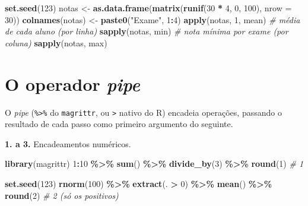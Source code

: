 \documentclass[
  portuguese,
  11pt,
  openany]{book}
\newenvironment{Shaded}{\begin{snugshade}}{\end{snugshade}}
\newcommand{\AttributeTok}[1]{\textcolor[rgb]{0.13,0.29,0.53}{#1}}
\newcommand{\CommentTok}[1]{\textcolor[rgb]{0.56,0.35,0.01}{\textit{#1}}}
\newcommand{\DecValTok}[1]{\textcolor[rgb]{0.00,0.00,0.81}{#1}}
\newcommand{\FunctionTok}[1]{\textcolor[rgb]{0.13,0.29,0.53}{\textbf{#1}}}
\newcommand{\NormalTok}[1]{#1}
\newcommand{\OtherTok}[1]{\textcolor[rgb]{0.56,0.35,0.01}{#1}}
\newcommand{\SpecialCharTok}[1]{\textcolor[rgb]{0.81,0.36,0.00}{\textbf{#1}}}
\newcommand{\StringTok}[1]{\textcolor[rgb]{0.31,0.60,0.02}{#1}}
\begin{document}
\begin{Shaded}
\begin{Highlighting}[]
\FunctionTok{set.seed}\NormalTok{(}\DecValTok{123}\NormalTok{)}
\NormalTok{notas }\OtherTok{\textless{}{-}} \FunctionTok{as.data.frame}\NormalTok{(}\FunctionTok{matrix}\NormalTok{(}\FunctionTok{runif}\NormalTok{(}\DecValTok{30} \SpecialCharTok{*} \DecValTok{4}\NormalTok{, }\DecValTok{0}\NormalTok{, }\DecValTok{100}\NormalTok{), }\AttributeTok{nrow =} \DecValTok{30}\NormalTok{))}
\FunctionTok{colnames}\NormalTok{(notas) }\OtherTok{\textless{}{-}} \FunctionTok{paste0}\NormalTok{(}\StringTok{"Exame"}\NormalTok{, }\DecValTok{1}\SpecialCharTok{:}\DecValTok{4}\NormalTok{)}
\FunctionTok{apply}\NormalTok{(notas, }\DecValTok{1}\NormalTok{, mean)     }\CommentTok{\# média de cada aluno (por linha)}
\FunctionTok{sapply}\NormalTok{(notas, min)        }\CommentTok{\# nota mínima por exame (por coluna)}
\FunctionTok{sapply}\NormalTok{(notas, max)}
\end{Highlighting}
\end{Shaded}

\section{\texorpdfstring{O operador \emph{pipe}}{O operador pipe}}\label{o-operador-pipe}

O \emph{pipe} (\texttt{\%\textgreater{}\%} do \texttt{magrittr}, ou \texttt{\textbar{}\textgreater{}} nativo do R) encadeia operações, passando
o resultado de cada passo como primeiro argumento do seguinte.

\textbf{1. a 3.} Encadeamentos numéricos.

\begin{Shaded}
\begin{Highlighting}[]
\FunctionTok{library}\NormalTok{(magrittr)}
\DecValTok{1}\SpecialCharTok{:}\DecValTok{10} \SpecialCharTok{\%\textgreater{}\%} \FunctionTok{sum}\NormalTok{() }\SpecialCharTok{\%\textgreater{}\%} \FunctionTok{divide\_by}\NormalTok{(}\DecValTok{3}\NormalTok{) }\SpecialCharTok{\%\textgreater{}\%} \FunctionTok{round}\NormalTok{(}\DecValTok{1}\NormalTok{)   }\CommentTok{\# 1}

\FunctionTok{set.seed}\NormalTok{(}\DecValTok{123}\NormalTok{)}
\FunctionTok{rnorm}\NormalTok{(}\DecValTok{100}\NormalTok{) }\SpecialCharTok{\%\textgreater{}\%} \FunctionTok{extract}\NormalTok{(. }\SpecialCharTok{\textgreater{}} \DecValTok{0}\NormalTok{) }\SpecialCharTok{\%\textgreater{}\%} \FunctionTok{mean}\NormalTok{() }\SpecialCharTok{\%\textgreater{}\%} \FunctionTok{round}\NormalTok{(}\DecValTok{2}\NormalTok{)   }\CommentTok{\# 2 (só os positivos)}
\end{Highlighting}
\end{Shaded}
\end{document}
